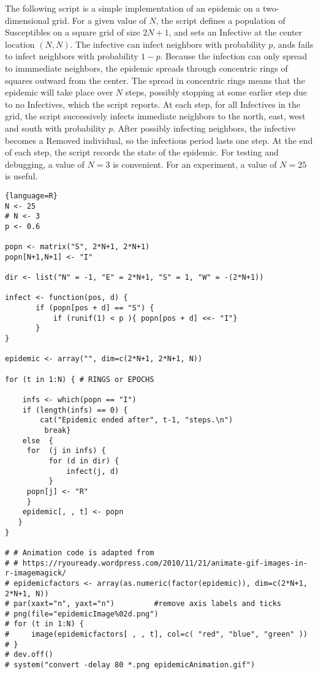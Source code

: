 \documentclass[12pt]{article}
\begin{document}
\begin{solution}
    The following script is a simple implementation of an epidemic on a
    two-dimensional grid.  For a given value of \( N \), the script
    defines a population of Susceptibles on a square grid of size \( 2N
    + 1 \), and sets an Infective at the center location \( (N, N) \).
    The infective can infect neighbors with probability \( p \), ands
    fails to infect neighbors with probability \( 1 - p \).  Because the
    infection can only spread to immmediate neighbors, the epidemic
    spreads through concentric rings of squares outward from the center.
    The spread in concentric rings means that the epidemic will take
    place over \( N \) steps, possibly stopping at some earlier step due
    to no Infectives, which the script reports.  At each step, for all
    Infectives in the grid, the script successively infects immediate
    neighbors to the north, east, west and south with probability \( p \).
    After possibly infecting neighbors, the infective becomes a Removed
    individual, so the infectious period lasts one step.  At the end of
    each step, the script records the state of the epidemic.  For
    testing and debugging, a value of \( N = 3 \) is convenient.  For an
    experiment, a value of \( N = 25 \) is useful.

\begin{lstlisting}{language=R}
N <- 25
# N <- 3
p <- 0.6

popn <- matrix("S", 2*N+1, 2*N+1)
popn[N+1,N+1] <- "I"

dir <- list("N" = -1, "E" = 2*N+1, "S" = 1, "W" = -(2*N+1))

infect <- function(pos, d) {
       if (popn[pos + d] == "S") {
           if (runif(1) < p ){ popn[pos + d] <<- "I"}
       }
}

epidemic <- array("", dim=c(2*N+1, 2*N+1, N)) 

for (t in 1:N) { # RINGS or EPOCHS
    
    infs <- which(popn == "I")
    if (length(infs) == 0) {
        cat("Epidemic ended after", t-1, "steps.\n")
         break}
    else  { 
     for  (j in infs) {
          for (d in dir) {
              infect(j, d)
          }
     popn[j] <- "R"
     }
    epidemic[, , t] <- popn
   }
}   

# # Animation code is adapted from
# # https://ryouready.wordpress.com/2010/11/21/animate-gif-images-in-r-imagemagick/
# epidemicfactors <- array(as.numeric(factor(epidemic)), dim=c(2*N+1, 2*N+1, N))
# par(xaxt="n", yaxt="n")         #remove axis labels and ticks
# png(file="epidemicImage%02d.png")
# for (t in 1:N) {
#     image(epidemicfactors[ , , t], col=c( "red", "blue", "green" ))
# }
# dev.off()
# system("convert -delay 80 *.png epidemicAnimation.gif")


\end{lstlisting}
\end{solution}
\end{document}

